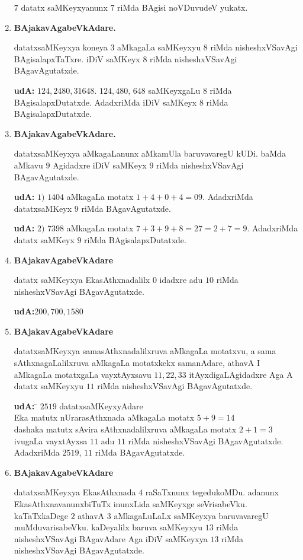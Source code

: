 \begin{enumerate}[{\rm 1)}]
$7$ datatx saMKeyxyanunx $7$ riMda BAgisi noVDuvudeV yukatx.
\item {} \textbf{BAjakavAgabeVkAdare.}

datatxsaMKeyxya koneya $3$ aMkagaLa saMKeyxyu $8$ riMda nisheshxVSavAgi BAgisalapxTaTxre. iDiV saMKeyx $8$ riMda nisheshxVSavAgi BAgavAgutatxde.

\textbf{udA:} $124,2480,31648$.  $124,480$, $648$ saMKeyxgaLu $8$ riMda BAgisalapxDutatxde. AdadxriMda iDiV saMKeyx $8$ riMda BAgisalapxDutatxde.

\vfill\eject
\item {} \textbf{BAjakavAgabeVkAdare.}

datatxsaMKeyxya aMkagaLanunx aMkamUla baruvavaregU kUDi. baMda aMkavu $9$ Agidadxre iDiV saMKeyx $9$ riMda nisheshxVSavAgi BAgavAgutatxde.

\textbf{udA:} $1)$ $1404$ aMkagaLa motatx $1+4+0+4 = 09$. AdadxriMda datatxsaMKeyx $9$ riMda BAgavAgutatxde.

\textbf{udA:} $2)$ $7398$ aMkagaLa motatx $7+3+9+8=27=2+7=9$. AdadxriMda datatx saMKeyx $9$ riMda BAgisalapxDutatxde.
\item{} \textbf{BAjakavAgabeVkAdare}

datatx saMKeyxya EkasAthxnadalilx $0$ idadxre adu $10$ riMda nisheshxVSavAgi BAgavAgutatxde.

\textbf{udA:}\quad $200,700,1580$
\item  {} \textbf{BAjakavAgabeVkAdare}

datatxsaMKeyxya samasAthxnadalilxruva aMkagaLa motatxvu, a sama sAthxnagaLalilxruva aMkagaLa motatxkekx samanAdare, athavA I aMkagaLa motatxgaLa vayxtAyxsavu $11,22,33$ itAyxdigaLAgidadxre Aga A datatx saMKeyxyu $11$ riMda nisheshxVSavAgi BAga\-vAgutatxde.
\begin{tabbing}
\textbf{udA:} \;\; \= $2519$ datatxsaMKeyxyAdare\\
\> Eka matutx nUrarasAthxnada aMkagaLa motatx $5+9=14$\\
\> dashaka matutx sAvira sAthxnadalilxruva aMkagaLa motatx $2+1=3$\\
\> ivugaLa vayxtAyxsa $11$ adu $11$ riMda nisheshxVSavAgi BAgavAgutatxde.\\
\> AdadxriMda $2519$, $11$ riMda BAgavAgutatxde.
\end{tabbing}
\item {} \textbf {BAjakavAgabeVkAdare}

datatxsaMKeyxya EkasAthxnada $4$ raSaTxnunx tegedukoMDu. adanunx EkasAthxnavanunx\-biTuTx inunxLida saMKeyxge seVrisabeVku. kaTaTxkaDege $2$ athavA $3$ aMkagaLuLaLx saMKeyxya baru\-vavaregU muMduvarisabeVku. kaDeyalilx baruva saMKeyxyu $13$ riMda nisheshxVSavAgi BAgavAdare Aga iDiV saMKeyxya $13$ riMda nisheshxVSavAgi BAgavAgutatxde.


\end{enumerate}
